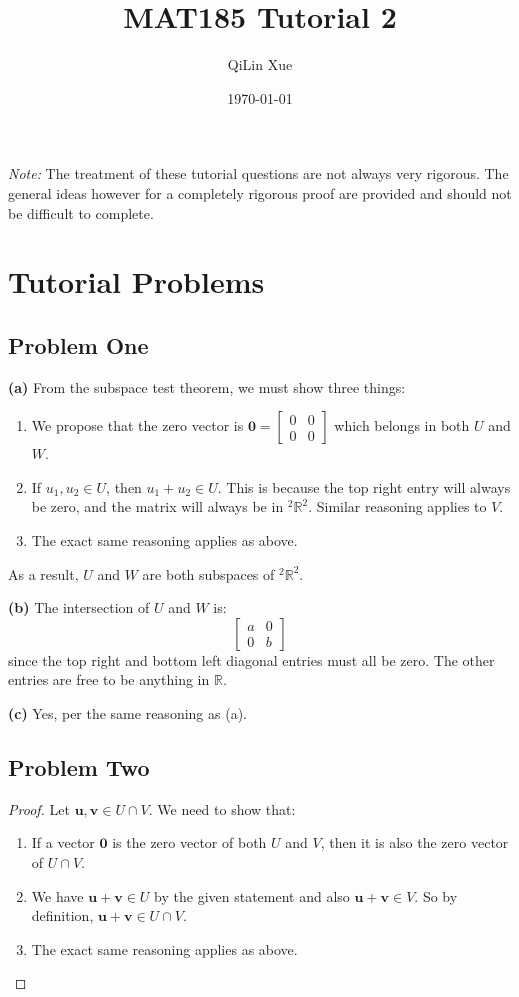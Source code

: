 \documentclass{article}
\title{MAT185 Tutorial 2}
\author{QiLin Xue}
\date{\today}
\begin{document}
\maketitle
\textit{Note:} The treatment of these tutorial questions are not always very rigorous. The general ideas however for a completely rigorous proof are provided and should not be difficult to complete.
\section{Tutorial Problems}
\subsection*{Problem One}
\textbf{(a)} From the subspace test theorem, we must show three things:
\begin{enumerate}[label=(S\Roman*)]
    \item We propose that the zero vector is $\bm{0} = \begin{bmatrix}
        0 & 0 \\ 
        0 & 0
    \end{bmatrix}$ which belongs in both $U$ and $W$.
    \item If $u_1,u_2 \in U$, then $u_1+u_2 \in U$. This is because the top right entry will always be zero, and the matrix will always be in $^2\mathbb{R}^2$. Similar reasoning applies to $V$.
    \item The exact same reasoning applies as above.
\end{enumerate}
As a result, $U$ and $W$ are both subspaces of $^2\mathbb{R}^2$.
\vspace{2mm}

\noindent \textbf{(b)} The intersection of $U$ and $W$ is:
$$
\begin{bmatrix}
    a & 0 \\ 
    0 & b
\end{bmatrix}
$$
since the top right and bottom left diagonal entries must all be zero. The other entries are free to be anything in $\mathbb{R}$.
\vspace{2mm}

\textbf{(c)} Yes, per the same reasoning as (a).
\subsection*{Problem Two}
\begin{proof}
Let $\bm{u},\bm{v} \in U \cap V$. We need to show that:
\begin{enumerate}[label=(S\Roman*)]
    \item If a vector $\bm{0}$ is the zero vector of both $U$ and $V$, then it is also the zero vector of $U \cap V$.
    \item We have $\bm{u}+\bm{v} \in U$ by the given statement and also $\bm{u}+\bm{v} \in V$. So by definition, $\bm{u}+\bm{v} \in U \cap V$.
    \item The exact same reasoning applies as above.
\end{enumerate}
\end{proof}
\end{document}
